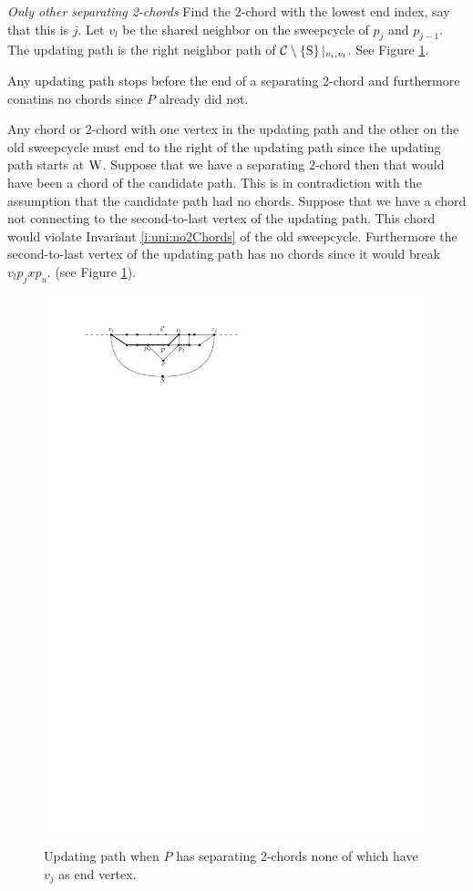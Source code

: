     \emph{Only other separating 2-chords}
      Find the $2$-chord with the lowest end index, say that this is $j$.
      Let $v_l$ be the shared neighbor on the sweepcycle of $p_{j}$ and $p_{j-1}$.
      The updating path is the right neighbor path of $\mathcal{C} \setminus \left\lbrace {\mathrm{S}} \right\rbrace|_{v_i, v_l}$. See Figure \ref{fig:sweep:free2chord}.

      Any updating path stops before the end of a separating 2-chord and furthermore conatins no chords since $P$ already did not.

      Any chord or $2$-chord with one vertex in the updating path and the other on the old sweepcycle must end to the right of the updating path since the updating path starts at $\mathrm{W}$.
      Suppose that we have a separating $2$-chord then that would have been a chord of the candidate path. This is in contradiction with the assumption that the candidate path had no chords.
      Suppose that we have a chord not connecting to the second-to-last vertex of the updating path. This chord would violate Invariant \ref{i:uni:no2Chords} of the old sweepcycle. Furthermore the second-to-last vertex of the updating path has no chords since it would break $v_l p_j x p_u$. (see Figure \ref{fig:sweep:free2chord}).

    \begin{figure}[b]
      \centering
      \includegraphics[scale=1]{unifiedAlgo/img/sweep/free2chord}
      \caption{Updating path when $P$ has separating 2-chords none of which have $v_j$ as end vertex.}
      \label{fig:sweep:free2chord}
    \end{figure}

